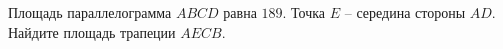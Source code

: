 \begin{ex}
	\begin{condition}
		Площадь параллелограмма \( ABCD \) равна \( 189 \). Точка \( E \) – середина стороны \( AD \). Найдите площадь трапеции \( AECB \).
	\end{condition}
\end{ex}
